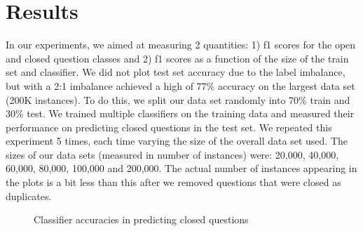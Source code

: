 \documentclass[11pt]{article}
\begin{document}
\section{Results}
In our experiments, we aimed at measuring 2 quantities: 1) f1 scores for the open and closed question classes and 2) f1 scores as a function of the size of
the train set and classifier.  We did not plot test set accuracy due to the label imbalance, but with a 2:1 imbalance achieved a high of 77\% accuracy on the largest data set (200K instances). To do this, we split our data set randomly into 70\%
train and 30\% test.  We trained multiple classifiers on the training
data and measured their performance on predicting closed questions in
the test set.  We repeated this experiment 5 times, each time varying
the size of the overall data set used.  The sizes of our data sets
(measured in number of instances) were: 20,000, 40,000, 60,000,
80,000, 100,000 and 200,000. The actual number of instances appearing in the plots is a bit less than this after we removed questions that were closed as duplicates.

\begin{figure}
\centering
{}
\caption{Classifier accuracies in predicting closed questions}
\label{fig:results}
\end{figure}
\end{document}
